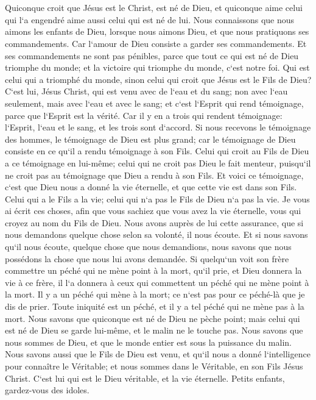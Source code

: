 \chapter{}

\verse Quiconque croit que Jésus est le Christ, est né de Dieu, et quiconque aime celui qui l`a engendré aime aussi celui qui est né de lui. 
\verse Nous connaissons que nous aimons les enfants de Dieu, lorsque nous aimons Dieu, et que nous pratiquons ses commandements. 
\verse Car l`amour de Dieu consiste a garder ses commandements. Et ses commandements ne sont pas pénibles, 
\verse parce que tout ce qui est né de Dieu triomphe du monde; et la victoire qui triomphe du monde, c`est notre foi. 
\verse Qui est celui qui a triomphé du monde, sinon celui qui croit que Jésus est le Fils de Dieu? 
\verse C`est lui, Jésus Christ, qui est venu avec de l`eau et du sang; non avec l`eau seulement, mais avec l`eau et avec le sang; et c`est l`Esprit qui rend témoignage, parce que l`Esprit est la vérité. 
\verse Car il y en a trois qui rendent témoignage: 
\verse l`Esprit, l`eau et le sang, et les trois sont d`accord. 
\verse Si nous recevons le témoignage des hommes, le témoignage de Dieu est plus grand; car le témoignage de Dieu consiste en ce qu`il a rendu témoignage à son Fils. 
\verse Celui qui croit au Fils de Dieu a ce témoignage en lui-même; celui qui ne croit pas Dieu le fait menteur, puisqu`il ne croit pas au témoignage que Dieu a rendu à son Fils. 
\verse Et voici ce témoignage, c`est que Dieu nous a donné la vie éternelle, et que cette vie est dans son Fils. 
\verse Celui qui a le Fils a la vie; celui qui n`a pas le Fils de Dieu n`a pas la vie. 
\verse Je vous ai écrit ces choses, afin que vous sachiez que vous avez la vie éternelle, vous qui croyez au nom du Fils de Dieu. 
\verse Nous avons auprès de lui cette assurance, que si nous demandons quelque chose selon sa volonté, il nous écoute. 
\verse Et si nous savons qu`il nous écoute, quelque chose que nous demandions, nous savons que nous possédons la chose que nous lui avons demandée. 
\verse Si quelqu`un voit son frère commettre un péché qui ne mène point à la mort, qu`il prie, et Dieu donnera la vie à ce frère, il l`a donnera à ceux qui commettent un péché qui ne mène point à la mort. Il y a un péché qui mène à la mort; ce n`est pas pour ce péché-là que je dis de prier. 
\verse Toute iniquité est un péché, et il y a tel péché qui ne mène pas à la mort. 
\verse Nous savons que quiconque est né de Dieu ne pèche point; mais celui qui est né de Dieu se garde lui-même, et le malin ne le touche pas. 
\verse Nous savons que nous sommes de Dieu, et que le monde entier est sous la puissance du malin. 
\verse Nous savons aussi que le Fils de Dieu est venu, et qu`il nous a donné l`intelligence pour connaître le Véritable; et nous sommes dans le Véritable, en son Fils Jésus Christ. 
\verse C`est lui qui est le Dieu véritable, et la vie éternelle. Petits enfants, gardez-vous des idoles. 
